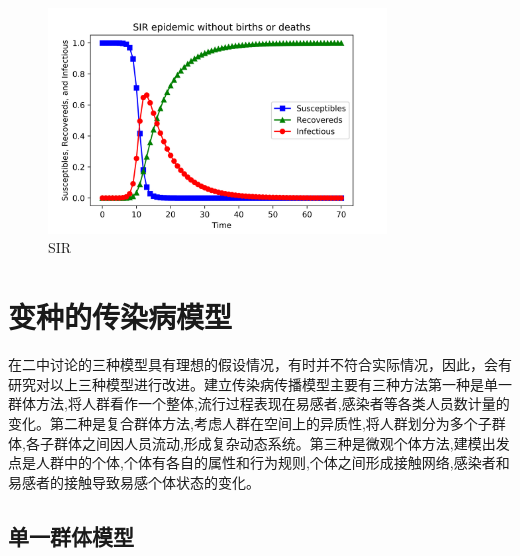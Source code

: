 \documentclass[12pt]{report}
\begin{document}
		\begin{figure}
			\centering
			\includegraphics[width=0.8\textwidth]{img/SIR.png}
			\caption{SIR} 
			\label{img}
		\end{figure}	
		
		\section{变种的传染病模型}
		
		在二中讨论的三种模型具有理想的假设情况，有时并不符合实际情况，因此，会有研究对以上三种模型进行改进。建立传染病传播模型主要有三种方法第一种是单一群体方法,将人群看作一个整体,流行过程表现在易感者,感染者等各类人员数计量的变化。第二种是复合群体方法,考虑人群在空间上的异质性,将人群划分为多个子群体,各子群体之间因人员流动,形成复杂动态系统。第三种是微观个体方法,建模出发点是人群中的个体,个体有各自的属性和行为规则,个体之间形成接触网络,感染者和易感者的接触导致易感个体状态的变化。
		
		\subsection{单一群体模型}
		
\end{document}
